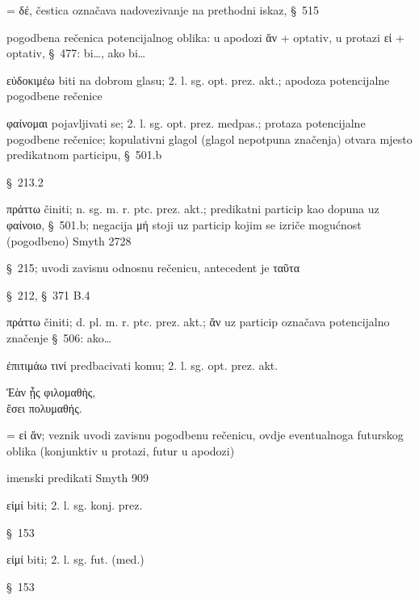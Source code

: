 \begin{description}[noitemsep]
\item[δ'] = δέ, čestica označava nadovezivanje na prethodni iskaz, §~515
\item[ἂν εὐδοκιμοίης, εἰ φαίνοιο] pogodbena rečenica potencijalnog oblika: u apodozi ἄν + optativ, u protazi εἰ + optativ, §~477: bi\dots, ako bi\dots
\item[εὐδοκιμοίης] εὐδοκιμέω biti na dobrom glasu; 2. l. sg. opt. prez. akt.; apodoza potencijalne pogodbene rečenice
\item[φαίνοιο] φαίνομαι pojavljivati se; 2. l. sg. opt. prez. medpas.; protaza potencijalne pogodbene rečenice; kopulativni glagol (glagol nepotpuna značenja) otvara mjesto predikatnom participu, §~501.b
\item[ταῦτα] §~213.2
\item[πράττων] πράττω činiti; n. sg. m. r. ptc. prez. akt.; predikatni particip kao dopuna uz φαίνοιο, §~501.b; negacija μή stoji uz particip kojim se izriče mogućnost (pogodbeno) Smyth 2728
\item[ἃ] §~215; uvodi zavisnu odnosnu rečenicu, antecedent je ταῦτα
\item[τοῖς ἄλλοις] §~212, §~371 B.4
\item[ἄν πράττουσιν] πράττω činiti; d. pl. m. r. ptc. prez. akt.; ἄν uz particip označava potencijalno značenje §~506: ako\dots
\item[ἐπιτιμῴης] ἐπιτιμάω τινί predbacivati komu; 2. l. sg. opt. prez. akt.
\end{description}

{\large
\noindent Ἐὰν ᾖς φιλομαθὴς, \\
ἔσει πολυμαθής.\\

}

\begin{description}[noitemsep]

\item[Ἐὰν] = εἰ ἄν; veznik uvodi zavisnu pogodbenu rečenicu, ovdje eventualnoga futurskog oblika (konjunktiv u protazi, futur u apodozi)
\item[ᾖς φιλομαθὴς\dots\ ἔσει πολυμαθής] imenski predikati Smyth 909
\item[ᾖς] εἰμί biti; 2. l. sg. konj. prez. 
\item[φιλομαθὴς] §~153
\item[ἔσει] εἰμί biti; 2. l. sg. fut. (med.)
\item[πολυμαθής] §~153
\end{description}

